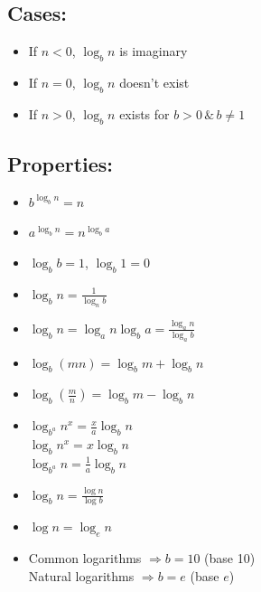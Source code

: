 \documentclass[11pt,a4paper,landscape]{article}
\begin{document}
\begin{multicols*}{3}
	\subsection{Cases:}
	\begin{itemize}
	\item If $n<0$, $\log_b n$ is imaginary
	\item If $n=0$, $\log_b n$ doesn't exist
	\item If $n>0$, $\log_b n$ exists for $b>0\,\&\,b \neq 1$
	\end{itemize}
	\subsection{Properties:}
	\begin{itemize}
	\item $b^{\log_b n}=n$
	\item $a^{\log_b n}=n^{\log_b a}$
	\item $\log_b b=1$, $\log_b 1=0$
	\item $\log_b n=\frac{1}{\log_n b}$
	\item $\log_b n=\log_a n\log_b a=\frac{\log_a n}{\log_a b}$
	\item $\log_b (mn)=\log_b m + \log_b n$
	\item $\log_b \left(\frac{m}{n}\right)=\log_b m - \log_b n$
	\item $\log_{b^a} n^x=\frac{x}{a}\log_b n$\\
		$\log_b n^x=x\log_b n$\\
		$\log_{b^a} n=\frac{1}{a}\log_b n$
	\item $\log_b n=\frac{\log n}{\log b}$
	\item $\log n=\log_e n$
	\item Common logarithms $\Rightarrow b=10$ (base 10)\\
		Natural logarithms $\Rightarrow b=e$ (base $e$)
	\end{itemize}

\end{multicols*}
\end{document}
